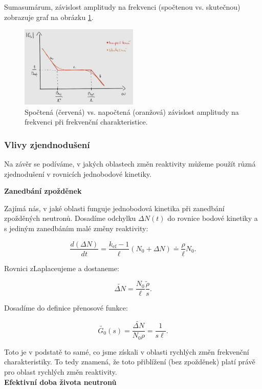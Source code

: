 Sumasumárum, závislost amplitudy na frekvenci (spočtenou vs. skutečnou) zobrazuje graf na obrázku \ref{fig_amplituda_frekvence}.

\begin{figure}[H]
  \centering
  \includegraphics[width=0.5\textwidth]{img/amplituda_frekvence.jpg}
  \caption{Spočtená (červená) vs. napočtená (oranžová) závislost amplitudy na frekvenci při frekvenční charakteristice.}
  \label{fig_amplituda_frekvence}
\end{figure}

\subsubsection{Vlivy zjendnodušení}

Na závěr se podíváme, v jakých oblastech změn reaktivity můžeme použít různá zjednodušení v rovnicích jednobodové kinetiky.

\textbf{Zanedbání zpožděnek}

Zajímá nás, v jaké oblasti funguje jednobodová kinetika při zanedbání zpožděných neutronů. Dosadíme odchylku $\Delta N(t)$ do rovnice bodové kinetiky a s jediným zanedbáním malé změny reaktivity:

$$ \dfrac{d (\Delta N)}{dt} = \dfrac{k_{\text{ef}}-1}{\ell} (N_0 + \Delta N) \doteq \dfrac{\rho}{\ell} N_0. $$

Rovnici zLaplaceujeme a dostaneme:

$$ \tilde{\Delta N} = \dfrac{N_0}{\ell} \dfrac{\tilde{\rho}}{s}. $$

Dosadíme do definice přenosové funkce:

$$ \tilde{G_0}(s) = \dfrac{\tilde{\Delta N}}{N_0 \rho} = \dfrac{1}{s \ell}. $$

Toto je v podstatě to samé, co jsme získali v oblasti rychlých změn frekvenční charakteristiky. To tedy znamená, že toto přiblížení (bez zpožděnek) platí právě pro oblast rychlých změn reaktivity.\\

\textbf{Efektivní doba života neutronů}

